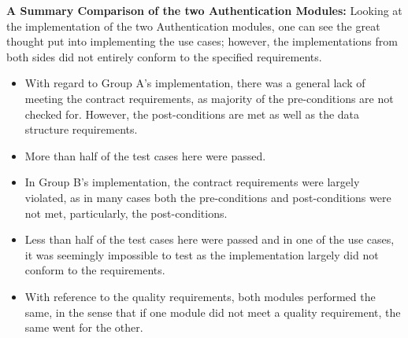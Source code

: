 \textbf{A Summary Comparison of the two Authentication Modules:}\newline
Looking at the implementation of the two Authentication modules, one can see the great thought put into implementing the use cases; however, the implementations from both sides did not entirely conform to the specified requirements.

\begin{itemize}
\item With regard to Group A's implementation, there was a general lack of meeting the contract requirements, as majority of the pre-conditions are not checked for. However, the post-conditions are met as well as the data structure requirements.

\item More than half of the test cases here were passed. \newline

\item In Group B's implementation, the contract requirements were largely violated, as in many cases both the pre-conditions and post-conditions were not met, particularly, the post-conditions. 

\item Less than half of the test cases here were passed and in one of the use cases, it was seemingly impossible to test as the implementation largely did not conform to the requirements. \newline

\item With reference to the quality requirements, both modules performed the same, in the sense that if one module did not meet a quality requirement, the same went for the other.
\end{itemize}